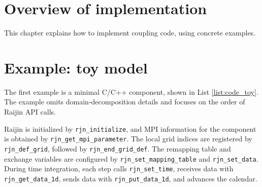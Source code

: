\documentclass[11pt,a4paper]{report}
\newcommand{\lstref}[1]{List \ref{#1}}
\begin{document}
\section{Overview of implementation}

This chapter explains how to implement coupling code,
using concrete examples.

\section{Example: toy model}

The first example is a minimal C/C++ component,
shown in \lstref{list:code_toy}.
The example omits domain-decomposition details
and focuses on the order of Raijin API calls.

Raijin is initialized by \texttt{rjn\_initialize},
and MPI information for the component is obtained
by \texttt{rjn\_get\_mpi\_parameter}.
The local grid indices are registered by
\texttt{rjn\_def\_grid}, followed by
\texttt{rjn\_end\_grid\_def}.
The remapping table and exchange variables are configured
by \texttt{rjn\_set\_mapping\_table} and \texttt{rjn\_set\_data}.
During time integration, each step calls
\texttt{rjn\_set\_time}, receives data with
\texttt{rjn\_get\_data\_1d}, sends data with
\texttt{rjn\_put\_data\_1d}, and advances the calendar.
\end{document}
